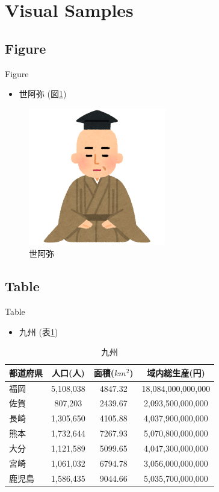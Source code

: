 \section{Visual Samples}

\subsection{Figure}
\begin{frame}{Figure}
  \begin{itemize}
    \item 世阿弥 (図\ref{figure:zeami})
  \end{itemize}
  \begin{figure}[htbp]
    \centering
    \includegraphics[width=60mm]{image/nigaoe_zeami.png}
    \caption{世阿弥}
    \label{figure:zeami}
  \end{figure}
\end{frame}

\subsection{Table}
\begin{frame}{Table}
  \begin{itemize}
    \item 九州 (表\ref{table:kyusyu})
  \end{itemize}
  \begin{table}[htbp]
    \centering
    \caption{九州}
    \label{table:kyusyu}
    \begin{tabular}{|l|c|c|c|}
      \hline
      都道府県 & 人口(人)  & 面積(\(km^2\)) & 域内総生産(円)  \\ \hline \hline
      福岡     & 5,108,038 & 4847.32        & 18,084,000,000,000 \\ \hline
      佐賀     &   807,203 & 2439.67        &  2,093,500,000,000 \\ \hline
      長崎     & 1,305,650 & 4105.88        &  4,037,900,000,000 \\ \hline
      熊本     & 1,732,644 & 7267.93        &  5,070,800,000,000 \\ \hline
      大分     & 1,121,589 & 5099.65        &  4,047,300,000,000 \\ \hline
      宮崎     & 1,061,032 & 6794.78        &  3,056,000,000,000 \\ \hline
      鹿児島   & 1,586,435 & 9044.66        &  5,035,700,000,000 \\ \hline
    \end{tabular}
  \end{table}
\end{frame}

